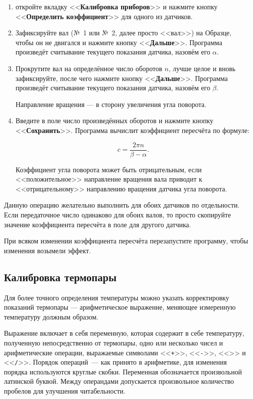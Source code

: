 \documentclass[12pt, a4paper, twocolumn]{book}
\newcommand{\CTL}[1]{<<{\bf #1}>>}
\newcommand{\CMD}[1]{<<{\tt #1}>>}
\begin{document}
\begin{enumerate}
\item откройте вкладку \CTL{Калибровка приборов} и нажмите кнопку \CTL{Определить коэффициент} для одного из датчиков.

\item Зафиксируйте вал (№~1 или №~2, далее просто <<вал>>) на Образце, чтобы он не двигался и нажмите кнопку \CTL{Дальше}. Программа произведёт считывание текущего показания датчика, назовём его $\alpha$.

\item Прокрутите вал на определённое число оборотов $n$, лучше целое и вновь зафиксируйте, после чего нажмите кнопку \CTL{Дальше}. Программа произведёт считывание текущего показания датчика, назовём его $\beta$. 

Направление вращения --- в сторону увеличения угла поворота.

\item Введите в поле число произведённых оборотов и нажмите кнопку \CTL{Сохранить}. Программа вычислит коэффициент пересчёта по формуле:

\begin{equation}
c = \frac{2 \pi n}{ \beta - \alpha }.
\end{equation}

Коэффициент угла поворота может быть отрицательным, если <<положительное>> направление вращения вала приводит к <<отрицательному>> направлению вращения датчика угла поворота.

\end{enumerate}

Данную операцию желательно выполнить для обоих датчиков по отдельности. Если передаточное число одинаково для обоих валов, то просто скопируйте значение коэффициента пересчёта в поле для другого датчика.

При всяком изменении коэффициента пересчёта перезапустите программу, чтобы изменения возымели эффект.

\subsection{Калибровка термопары}

Для более точного определения температуры можно указать корректировку показаний термопары --- арифметическое выражение, меняющее измеренную температуру должным образом.

Выражение включает в себя переменную, которая содержит в себе температуру, полученную непосредственно от термопары, одно или несколько чисел и арифметические операции, выражаемые символами \CMD{+}, \CMD{-}, \CMD{*} и \CMD{/}. Порядок операций~--- как принято в арифметике, для изменения порядка используются круглые скобки. Переменная обозначается произвольной латинской буквой. Между операндами допускается произвольное количество пробелов для улучшения читабельности.
\end{document}
